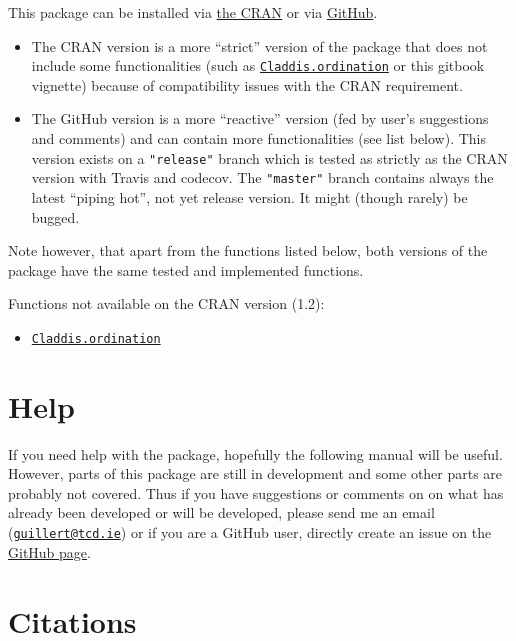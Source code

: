 \documentclass[]{book}
\providecommand{\tightlist}{%
  \setlength{\itemsep}{0pt}\setlength{\parskip}{0pt}}
\theoremstyle{definition}
\theoremstyle{definition}
\theoremstyle{definition}
\theoremstyle{remark}
\begin{document}
This package can be installed via \href{}{the CRAN} or via
\href{https://github.com/TGuillerme/dispRity}{GitHub}.

\begin{itemize}
\item
  The CRAN version is a more ``strict'' version of the package that does
  not include some functionalities (such as
  \protect\hyperlink{Claddis-ordination}{\texttt{Claddis.ordination}} or
  this gitbook vignette) because of compatibility issues with the CRAN
  requirement.
\item
  The GitHub version is a more ``reactive'' version (fed by user's
  suggestions and comments) and can contain more functionalities (see
  list below). This version exists on a \texttt{"release"} branch which
  is tested as strictly as the CRAN version with Travis and codecov. The
  \texttt{"master"} branch contains always the latest ``piping hot'',
  not yet release version. It might (though rarely) be bugged.
\end{itemize}

Note however, that apart from the functions listed below, both versions
of the package have the same tested and implemented functions.

Functions not available on the CRAN version (1.2):

\begin{itemize}
\tightlist
\item
  \protect\hyperlink{Claddis-ordination}{\texttt{Claddis.ordination}}
\end{itemize}

\section{Help}\label{help}

If you need help with the package, hopefully the following manual will
be useful. However, parts of this package are still in development and
some other parts are probably not covered. Thus if you have suggestions
or comments on on what has already been developed or will be developed,
please send me an email
(\href{mailto:guillert@tcd.ie}{\nolinkurl{guillert@tcd.ie}}) or if you
are a GitHub user, directly create an issue on the
\href{https://github.com/TGuillerme/dispRity}{GitHub page}.

\section{Citations}\label{citations}
\end{document}
